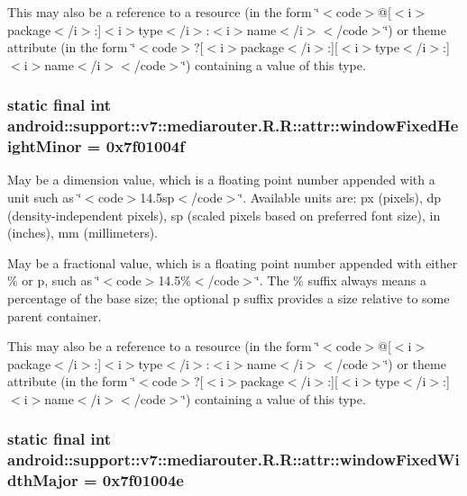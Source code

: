 This may also be a reference to a resource (in the form \char`\"{}$<$code$>$@\mbox{[}$<$i$>$package$<$/i$>$:\mbox{]}$<$i$>$type$<$/i$>$:$<$i$>$name$<$/i$>$$<$/code$>$\char`\"{}) or theme attribute (in the form \char`\"{}$<$code$>$?\mbox{[}$<$i$>$package$<$/i$>$:\mbox{]}\mbox{[}$<$i$>$type$<$/i$>$:\mbox{]}$<$i$>$name$<$/i$>$$<$/code$>$\char`\"{}) containing a value of this type. \hypertarget{classandroid_1_1support_1_1v7_1_1mediarouter_1_1_r_1_1attr_54848435a9e4ed1500885cfa7fbcdd62}{
\subsubsection[{windowFixedHeightMinor}]{\setlength{\rightskip}{0pt plus 5cm}static final int android::support::v7::mediarouter.R.R::attr::windowFixedHeightMinor = 0x7f01004f}}
\label{classandroid_1_1support_1_1v7_1_1mediarouter_1_1_r_1_1attr_54848435a9e4ed1500885cfa7fbcdd62}


May be a dimension value, which is a floating point number appended with a unit such as \char`\"{}$<$code$>$14.5sp$<$/code$>$\char`\"{}. Available units are: px (pixels), dp (density-independent pixels), sp (scaled pixels based on preferred font size), in (inches), mm (millimeters). 

May be a fractional value, which is a floating point number appended with either \% or p, such as \char`\"{}$<$code$>$14.5\%$<$/code$>$\char`\"{}. The \% suffix always means a percentage of the base size; the optional p suffix provides a size relative to some parent container. 

This may also be a reference to a resource (in the form \char`\"{}$<$code$>$@\mbox{[}$<$i$>$package$<$/i$>$:\mbox{]}$<$i$>$type$<$/i$>$:$<$i$>$name$<$/i$>$$<$/code$>$\char`\"{}) or theme attribute (in the form \char`\"{}$<$code$>$?\mbox{[}$<$i$>$package$<$/i$>$:\mbox{]}\mbox{[}$<$i$>$type$<$/i$>$:\mbox{]}$<$i$>$name$<$/i$>$$<$/code$>$\char`\"{}) containing a value of this type. \hypertarget{classandroid_1_1support_1_1v7_1_1mediarouter_1_1_r_1_1attr_cea414b115d5192b0db53813d6158a22}{
\subsubsection[{windowFixedWidthMajor}]{\setlength{\rightskip}{0pt plus 5cm}static final int android::support::v7::mediarouter.R.R::attr::windowFixedWidthMajor = 0x7f01004e}}
\label{classandroid_1_1support_1_1v7_1_1mediarouter_1_1_r_1_1attr_cea414b115d5192b0db53813d6158a22}


